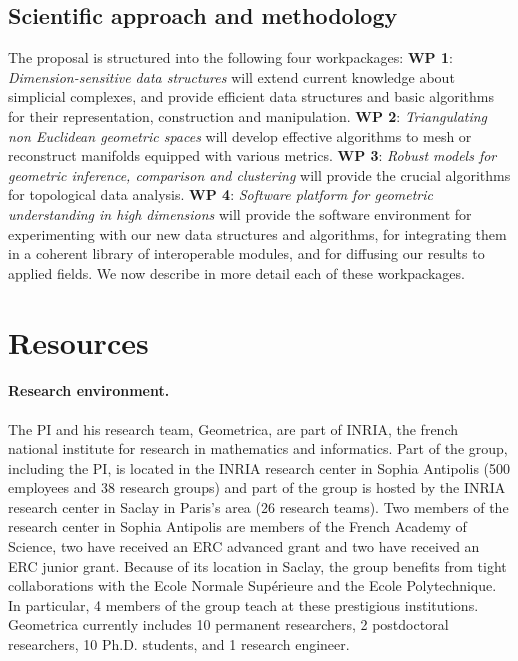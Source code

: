 \subsection{Scientific approach and methodology}

The proposal is structured into the following four workpackages:
{\bf WP 1}:  {\em Dimension-sensitive data  structures} will extend current knowledge about simplicial complexes, and  provide efficient data structures and basic algorithms for their representation, construction and manipulation. 
  {\bf WP 2}:  {\em Triangulating non Euclidean geometric spaces} will develop effective algorithms to mesh or reconstruct manifolds equipped with various metrics.   {\bf WP 3}: {\em Robust models for geometric inference, comparison and  clustering} will provide the crucial  algorithms for topological data analysis.
 {\bf WP 4}:  {\em  Software platform for geometric understanding in high dimensions} will provide the software environment for experimenting with our new data structures and algorithms, for integrating them in a coherent library of interoperable modules, and for diffusing our results to applied fields. We now describe in more detail each of these workpackages.











\section{Resources}

\paragraph{Research environment.}
The PI and his research team, Geometrica, are part of INRIA, the french national institute for research in mathematics and informatics. Part of the group, including the PI, is located in the INRIA research center in Sophia Antipolis  (500 employees and 38 research groups) and part of the group is hosted by the INRIA research center in Saclay in Paris's area (26 research teams). Two members of the research center in Sophia Antipolis are members of the French Academy of Science, two have received an ERC advanced grant and two have received an ERC junior grant. Because of its location in Saclay, the group benefits from tight collaborations with the Ecole Normale Sup\'erieure and the Ecole Polytechnique. In particular, 4 members of the group teach at these prestigious institutions. Geometrica currently includes 10 permanent researchers,  2 postdoctoral researchers, 10 Ph.D. students, and 1 research engineer. 

